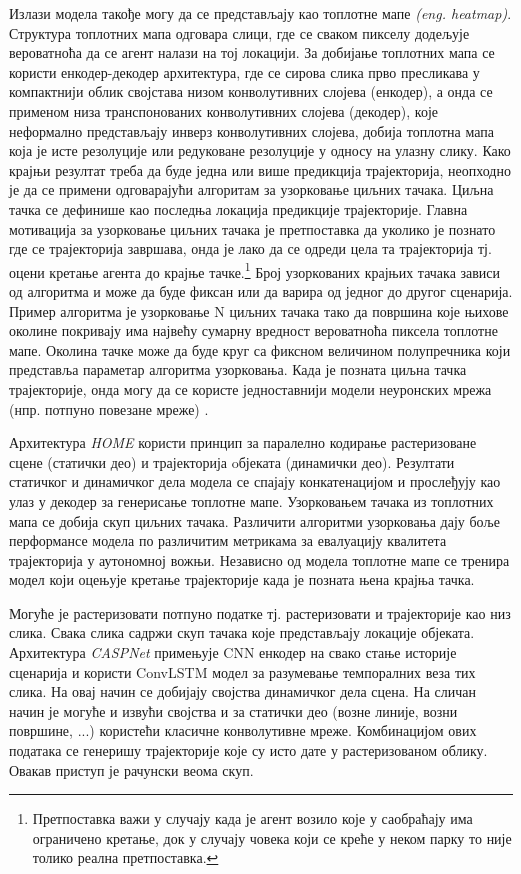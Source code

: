 \documentclass[11pt,oneside]{memoir}
\begin{document}
Излази модела такође могу да се представљају као топлотне мапе \textit{(eng. heatmap)}. Структура топлотних мапа
одговара слици, где се сваком пикселу додељује вероватноћа
да се агент налази на тој локацији. За добијање топлотних мапа се користи енкодер-декодер архитектура, где се сирова слика
прво пресликава у компактнији облик својстава низом конволутивних слојева (енкодер), а онда се
применом низа транспонованих конволутивних слојева (декодер), које неформално представљају инверз конволутивних слојева, добија
топлотна мапа која је исте резолуције или редуковане резолуције у односу на улазну слику.
Како крајњи резултат треба да буде једна или више предикција трајекторија, неопходно је да се примени одговарајући алгоритам за
узорковање циљних тачака. Циљна тачка
се дефинише као последња локација предикције трајекторије. Главна мотивација за узорковање циљних тачака је претпоставка да уколико је познато где се
трајекторија завршава, онда је лако да се одреди цела та трајекторија тј. оцени кретање агента до крајње
тачке.\footnote{Претпоставка важи
у случају када је агент возило које у саобраћају има ограничено кретање, док у случају човека који се креће у неком парку то није толико реална
претпоставка.} Број узоркованих крајњих тачака зависи од алгоритма и може да буде фиксан или да варира од једног до другог сценарија. 
Пример алгоритма је узорковање N циљних тачака тако да површина које њихове околине покривају има највећу сумарну вредност вероватноћа 
пиксела топлотне мапе. Околина
тачке може да буде круг са фиксном величином полупречника који представља параметар алгоритма узорковања. Када је позната циљна тачка трајекторије,
онда могу да се користе једноставнији модели неуронских мрежа (нпр. потпуно повезане мреже) \cite{home, centernet}.

Архитектура \textit{HOME} \cite{home} користи принцип за паралелно кодирање растеризоване сцене (статички део)
и трајекторија oбјеката (динамички део). Резултати
статичког и динамичког дела модела се спајају конкатенацијом и прослеђују као улаз у декодер за генерисање топлотне мапе. 
Узорковањем тачака из топлотних мапа се добија скуп циљних тачака. Различити алгоритми узорковања дају
боље перформансе модела по различитим метрикама за евалуацију квалитета трајекторија у аутономној вожњи. Независно од модела топлотне мапе
се тренира модел који оцењује кретање трајекторије када је позната њена крајња тачка.

Могуће је растеризовати потпуно податке тј. растеризовати и трајекторије као низ слика. Свака слика садржи скуп тачака које представљају
локације објеката. Архитектура \textit{CASPNet} \cite{caspnet} примењује CNN енкодер на свако стање историје сценарија 
и користи ConvLSTM \cite{convlstm} модел за разумевање
темпоралних веза тих слика. На овај начин се добијају својства динамичког дела сцена. 
На сличан начин је могуће и извући својства и за 
статички део (возне линије, возни површине, ...) користећи класичне конволутивне мреже. Комбинацијом ових података се генеришу
трајекторије које су исто дате у растеризованом облику. Овакав приступ је рачунски веома скуп.
\end{document}
